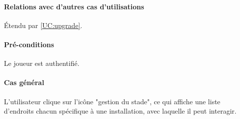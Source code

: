 \paragraph{Relations avec d'autres cas d'utilisations}
Étendu par \ref{UC:upgrade}.
\paragraph{Pré-conditions}
\begin{list}{}{\leftmargin=1.5em}
\item{Le joueur est authentifié.}
\end{list}
\paragraph{Cas général}
L'utilisateur clique sur l'icône "gestion du stade", ce qui affiche une liste d'endroits chacun spécifique à une installation, avec laquelle il peut interagir. 
